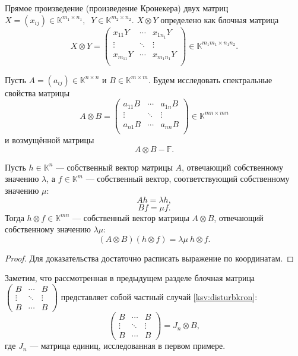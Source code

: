 Прямое произведение (произведение Кронекера)
    двух матриц
    \( X{=}(x_{ij}){\in}\mathbb{K}^{m_1{\times}n_1},\ \)
    \( Y{\in}\mathbb{K}^{m_2{\times}n_2} \).
    \( X\otimes Y \)
    определено как блочная матрица
\[
    X\otimes Y =
    \begin{pmatrix}
        x_{11} Y & \cdots & x_{1n_1} Y \\
        \vdots   & \ddots & \vdots \\
        x_{m_11} Y & \cdots & x_{m_1n_1} Y \\
    \end{pmatrix}\in\mathbb{K}^{m_1m_1\times n_1n_2}.
    \]

Пусть \( A{=}(a_{ij}){\in}\mathbb{K}^{n\times n} \)
и \( B\in\mathbb{K}^{m\times m} \).
Будем исследовать спектральные свойства
    матрицы
    \[
        A\otimes B = 
        \begin{pmatrix}
            a_{11} B & \cdots & a_{1n} B \\
            \vdots   & \ddots & \vdots \\
            a_{n1} B & \cdots & a_{nn} B \\
        \end{pmatrix}\in\mathbb{K}^{mn\times mn}
        \]
    и возмущённой матрицы
    \begin{equation}\label{ksv:disturbkron}
        A\otimes B - \mathbb{F}.
    \end{equation}

\begin{ksvlem}
    Пусть \( h\in\mathbb{K}^n \) --- собственный вектор матрицы \( A \),
    отвечающий собственному значению \( \lambda \),
    а \( f\in\mathbb{K}^m \) --- собственный вектор,
    соответствующий собственному значению \( \mu \):
    \[
        A h = \lambda h,
        \]
    \[
        B f = \mu f.
        \]
    Тогда \( h\otimes f \in \mathbb{K}^{mn} \)
    --- собственный вектор матрицы \( A\otimes B \),
    отвечающий собственному значению \( \lambda\mu \):
    \[
        (A\otimes B)(h\otimes f) = \lambda\mu\ h\otimes f.
        \]
\end{ksvlem}
\begin{proof}
    Для доказательства достаточно расписать выражение по координатам.
\end{proof}

Заметим, что рассмотренная в предыдущем разделе
    блочная матрица
\(
    \begin{pmatrix}
        B      & \cdots & B \\
        \vdots & \ddots & \vdots \\
        B      & \cdots & B
    \end{pmatrix}
        \)
    представляет собой частный случай \eqref{ksv:disturbkron}:
\[
    \begin{pmatrix}
        B      & \cdots & B \\
        \vdots & \ddots & \vdots \\
        B      & \cdots & B
    \end{pmatrix} =
    J_n \otimes B,
        \]
    где \( J_n \) --- матрица единиц,
    исследованная в первом примере.
